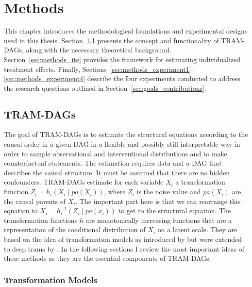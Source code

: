 




\chapter{Methods}

This chapter introduces the methodological foundations and experimental designs used in this thesis. Section~\ref{sec:methods_tram_dags} presents the concept and functionality of TRAM-DAGs, along with the necessary theoretical background. Section~\ref{sec:methods_ite} provides the framework for estimating individualized treatment effects. Finally, Sections~\ref{sec:methods_experiment1}--\ref{sec:methods_experiment4} describe the four experiments conducted to address the research questions outlined in Section~\ref{sec:goals_contributions}.


\section{TRAM-DAGs} \label{sec:methods_tram_dags}

The goal of TRAM-DAGs is to estimate the structural equations according to the causal order in a given DAG in a flexible and possibly still interpretable way in order to sample observational and interventional distributions and to make counterfactual statements. The estimation requires data and a DAG that describes the causal structure. It must be assumed that there are no hidden confounders. TRAM-DAGs estimate for each variable $X_i$ a transformation function $Z_i = h_i(X_i \mid pa(X_i))$, where $Z_i$ is the noise value and $pa(X_i)$ are the causal parents of $X_i$. The important part here is that we can rearrange this equation to $X_i = h_i^{-1}(Z_i \mid pa(x_i))$ to get to the structural equation. The transformation functions $h$ are monotonically increasing functions that are a representation of the conditional distribution of $X_i$ on a latent scale. They are based on the idea of transformation models as introduced by \citet{hothorn2014} but were extended to deep trams by \citet{sick2020}. In the following sections I review the most important ideas of these methods as they are the essential components of TRAM-DAGs.

\subsection{Transformation Models}


